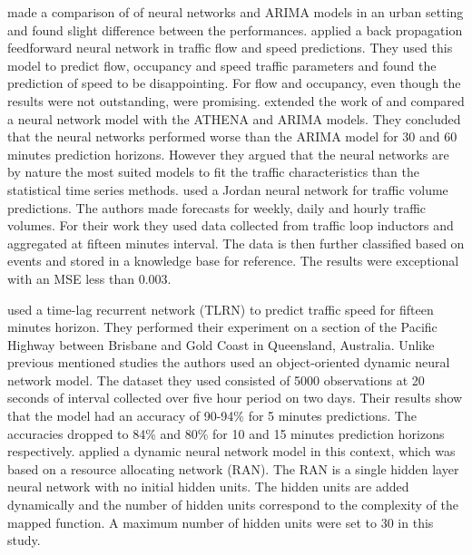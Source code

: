 \citet{clark1993use} made a comparison of of neural networks and ARIMA models in an urban setting
and found slight difference between the performances. \citet{dougherty1997short} applied a
back propagation feedforward neural network in traffic flow and speed predictions. They used this
model to predict flow, occupancy and speed traffic parameters and found the prediction of speed to
be disappointing. For flow and occupancy, even though the results were not outstanding, were promising.
\citet{kirby1997should} extended the work of \citet{clark1993use} and compared a neural network model
with the ATHENA and ARIMA models. They concluded that the neural networks performed worse than the
ARIMA model for 30 and 60 minutes prediction horizons. However they argued that the neural networks
are by nature the most suited models to fit the traffic characteristics than the statistical time
series methods. \citet{yasdi1999prediction} used a Jordan neural network for traffic volume predictions.
The authors made forecasts for weekly, daily and hourly traffic volumes. For their work they used
data collected from traffic loop inductors and aggregated at fifteen minutes interval. The data is
then further classified based on events and stored in a knowledge base for reference. The results were
exceptional with an MSE less than 0.003.

\citet{dia2001object} used a time-lag recurrent network (TLRN) to predict traffic speed for fifteen
minutes horizon. They performed their experiment on a section of the Pacific Highway between
Brisbane and Gold Coast in Queensland, Australia. Unlike previous mentioned studies the authors used
an object-oriented dynamic neural network model. The dataset they used consisted of 5000
observations at 20 seconds of interval collected over five hour period on two days. Their results
show that the model had an accuracy of 90-94\% for 5 minutes predictions. The accuracies dropped
to 84\% and 80\% for 10 and 15 minutes prediction horizons respectively. \citet{chen2001use} applied
a dynamic neural network model in this context, which was based on a resource allocating network (RAN).
The RAN is a single hidden layer neural network with no initial hidden units. The hidden units are added
dynamically and the number of hidden units correspond to the complexity of the mapped function. 
A maximum number of hidden units were set to 30 in this study.

